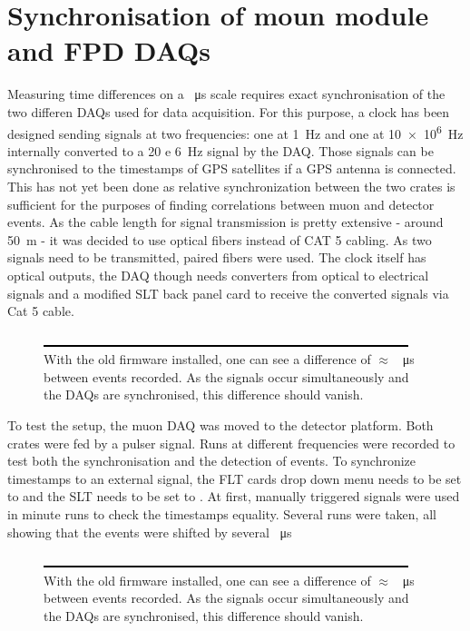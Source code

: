   \section{Synchronisation of moun module and FPD DAQs}
  \label{ch:Analysis:sec:Synchronisation of moun module and FPD DAQs}
  Measuring time differences on a \SI{}{\micro\second} scale requires exact synchronisation of the two differen DAQs used for data acquisition. For this purpose, a clock has been designed sending signals at two frequencies: one at \SI{1}{\hertz} and one at \SI{10e6}{\hertz} internally converted to a \SI{20 e 6}{\hertz} signal by the DAQ. Those signals can be synchronised to the timestamps of GPS satellites if a GPS antenna is connected. This has not yet been done as relative synchronization between the two crates is sufficient for the purposes of finding correlations between muon and detector events. As the cable length for signal transmission is pretty extensive - around \SI{50}{\meter} - it was decided to use optical fibers instead of CAT 5 cabling. As two signals need to be transmitted, paired  fibers were used. The clock itself has optical outputs, the DAQ though needs converters from optical to electrical signals and a modified SLT back panel card to receive the converted 
signals via Cat 5 cable.
  \begin{figure}
  	\includegraphics[width = 0.9 \textwidth]{graphics/dummy.eps}
  	\caption[Unsynced DAQs]{With the old firmware installed, one can see a difference of $\approx$ \SI{}{\micro\second} between events recorded. As the signals occur simultaneously and the DAQs are synchronised, this difference should vanish.}
  	\label{fig:analysis:outOfSync}
  \end{figure}

  
  To test the setup, the muon DAQ was moved to the detector platform. Both crates were fed by a pulser signal. Runs at different frequencies were recorded to test both the synchronisation and the detection of events. To synchronize timestamps to an external signal, the FLT cards drop down menu needs to be set to  and the SLT needs to be set to .
  At first, manually triggered signals were used in minute runs to check the timestamps equality. Several runs were taken, all showing that the events were shifted by several \SI{}{\micro\second}
  \begin{figure}
	\includegraphics[width = 0.9 \textwidth]{graphics/dummy.eps}
  	\caption[Unsynced DAQs]{With the old firmware installed, one can see a difference of $\approx$ \SI{}{\micro\second} between events recorded. As the signals occur simultaneously and the DAQs are synchronised, this difference should vanish.}
  	\label{fig:analysis:inSync}
  \end{figure}

